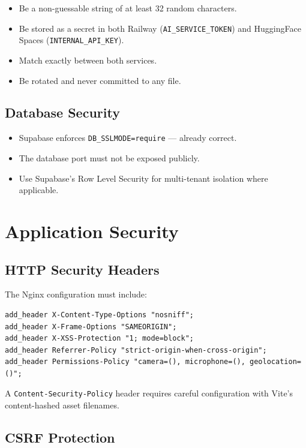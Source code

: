 \documentclass[12pt,a4paper]{report}
\begin{document}
\begin{itemize}[leftmargin=1.5em]
    \item Be a non-guessable string of at least 32 random characters.
    \item Be stored as a secret in both Railway (\texttt{AI\_SERVICE\_TOKEN})
          and HuggingFace Spaces (\texttt{INTERNAL\_API\_KEY}).
    \item Match exactly between both services.
    \item Be rotated and never committed to any file.
\end{itemize}

\subsection{Database Security}

\begin{itemize}[leftmargin=1.5em]
    \item Supabase enforces \texttt{DB\_SSLMODE=require} — already correct.
    \item The database port must not be exposed publicly.
    \item Use Supabase's Row Level Security for multi-tenant isolation
          where applicable.
\end{itemize}

\section{Application Security}

\subsection{HTTP Security Headers}

The Nginx configuration must include:

\begin{lstlisting}[caption={Required Nginx security headers}]
add_header X-Content-Type-Options "nosniff";
add_header X-Frame-Options "SAMEORIGIN";
add_header X-XSS-Protection "1; mode=block";
add_header Referrer-Policy "strict-origin-when-cross-origin";
add_header Permissions-Policy "camera=(), microphone=(), geolocation=()";
\end{lstlisting}

A \texttt{Content-Security-Policy} header requires careful configuration
with Vite's content-hashed asset filenames.

\subsection{CSRF Protection}
\end{document}
